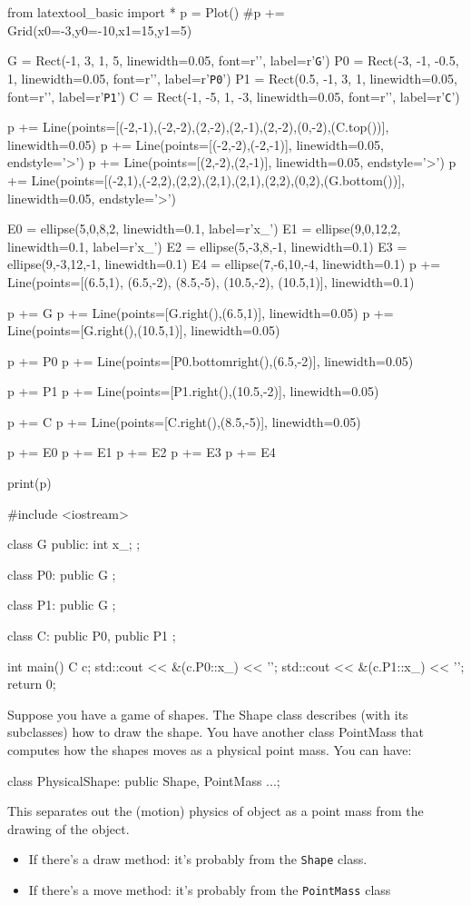 \begin{python}
from latextool_basic import *
p = Plot()
#p += Grid(x0=-3,y0=-10,x1=15,y1=5)

G = Rect(-1, 3, 1, 5, linewidth=0.05, font=r'\huge', label=r'\texttt{G}')
P0 = Rect(-3, -1, -0.5, 1, linewidth=0.05, font=r'\huge', label=r'\texttt{P0}')
P1 = Rect(0.5, -1, 3, 1, linewidth=0.05, font=r'\huge', label=r'\texttt{P1}')
C = Rect(-1, -5, 1, -3, linewidth=0.05, font=r'\huge', label=r'\texttt{C}')

p += Line(points=[(-2,-1),(-2,-2),(2,-2),(2,-1),(2,-2),(0,-2),(C.top())], linewidth=0.05)
p += Line(points=[(-2,-2),(-2,-1)], linewidth=0.05, endstyle='>')
p += Line(points=[(2,-2),(2,-1)], linewidth=0.05, endstyle='>')
p += Line(points=[(-2,1),(-2,2),(2,2),(2,1),(2,1),(2,2),(0,2),(G.bottom())], linewidth=0.05, endstyle='>')

E0 = ellipse(5,0,8,2, linewidth=0.1, label=r'x\_')
E1 = ellipse(9,0,12,2, linewidth=0.1, label=r'x\_')
E2 = ellipse(5,-3,8,-1, linewidth=0.1)
E3 = ellipse(9,-3,12,-1, linewidth=0.1)
E4 = ellipse(7,-6,10,-4, linewidth=0.1)
p += Line(points=[(6.5,1), (6.5,-2), (8.5,-5), (10.5,-2), (10.5,1)], linewidth=0.1)

p += G
p += Line(points=[G.right(),(6.5,1)], linewidth=0.05)
p += Line(points=[G.right(),(10.5,1)], linewidth=0.05)

p += P0
p += Line(points=[P0.bottomright(),(6.5,-2)], linewidth=0.05)

p += P1
p += Line(points=[P1.right(),(10.5,-2)], linewidth=0.05)

p += C
p += Line(points=[C.right(),(8.5,-5)], linewidth=0.05)


p += E0
p += E1
p += E2
p += E3
p += E4

print(p)
\end{python}

\begin{console}
#include <iostream>

class G
{
public:
        int x_;
};

class P0: public G
{};

class P1: public G
{};

class C: public P0, public P1
{};

int main()
{   
    C c;
    std::cout << &(c.P0::x_) << '\n';
    std::cout << &(c.P1::x_) << '\n';
    return 0;
}
\end{console}

Suppose you have a game of shapes. The Shape class describes (with its
subclasses) how to draw the shape. You have another class PointMass that
computes how the shapes moves as a physical point mass. You can have:
\begin{console}
class PhysicalShape: public Shape, PointMass
{...};
\end{console}

This separates out the (motion) physics of object as a point mass from
the drawing of the object.

\begin{itemize}
\item
  If there's a draw method: it's
  probably from the \verb!Shape! class.
\item
  If there's a move method: it's
  probably from the \verb!PointMass! class
\end{itemize}

